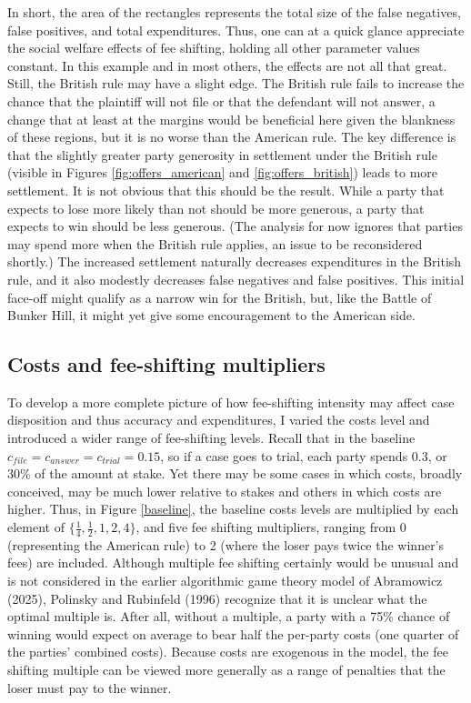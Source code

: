 \documentclass{article}
\begin{document}
In short, the area of the rectangles represents the total size of the false negatives, false positives, and total expenditures. Thus, one can at a quick glance appreciate the social welfare effects of fee shifting, holding all other parameter values constant. In this example and in most others, the effects are not all that great. Still, the British rule may have a slight edge. The British rule fails to increase the chance that the plaintiff will not file or that the defendant will not answer, a change that at least at the margins would be beneficial here given the blankness of these regions, but it is no worse than the American rule. The key difference is that the slightly greater party generosity in settlement under the British rule (visible in Figures \ref{fig:offers_american} and \ref{fig:offers_british}) leads to more settlement. It is not obvious that this should be the result. While a party that expects to lose more likely than not should be more generous, a party that expects to win should be less generous. (The analysis for now ignores that parties may spend more when the British rule applies, an issue to be reconsidered shortly.) The increased settlement naturally decreases expenditures in the British rule, and it also modestly decreases false negatives and false positives. This initial face-off might qualify as a narrow win for the British, but, like the Battle of Bunker Hill, it might yet give some encouragement to the American side. 

\subsection{Costs and fee-shifting multipliers}

To develop a more complete picture of how fee-shifting intensity may affect case disposition and thus accuracy and expenditures, I varied the costs level and introduced a wider range of fee-shifting levels. Recall that in the baseline $c_{file}=c_{answer}=c_{trial}=0.15$, so if a case goes to trial, each party spends 0.3, or 30\% of the amount at stake. Yet there may be some cases in which costs, broadly conceived, may be much lower relative to stakes and others in which costs are higher. Thus, in Figure \ref{baseline}, the baseline costs levels are multiplied by each element of $\{\frac{1}{4}, \frac{1}{2}, 1, 2, 4\}$, and five fee shifting multipliers, ranging from 0 (representing the American rule) to 2 (where the loser pays twice the winner's fees) are included. Although multiple fee shifting certainly would be unusual and is not considered in the earlier algorithmic game theory model of Abramowicz (2025), Polinsky and Rubinfeld (1996) \cite{polinskyrubinfeld1996} recognize that it is unclear what the optimal multiple is. After all, without a multiple, a party with a 75\% chance of winning would expect on average to bear half the per-party costs (one quarter of the parties' combined costs). Because costs are exogenous in the model, the fee shifting multiple can be viewed more generally as a range of penalties that the loser must pay to the winner.
\end{document}
